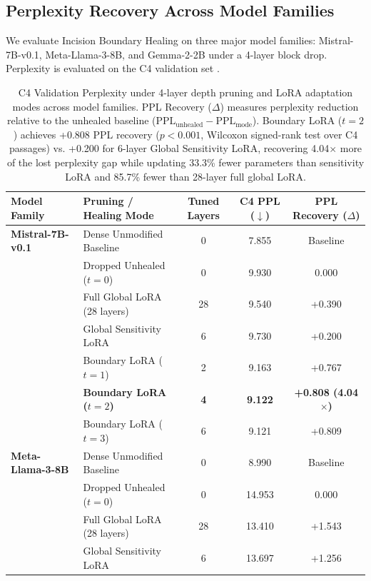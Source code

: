 \documentclass[11pt]{article}
\begin{document}
\subsection{Perplexity Recovery Across Model Families}

We evaluate Incision Boundary Healing on three major model families: Mistral-7B-v0.1, Meta-Llama-3-8B, and Gemma-2-2B under a 4-layer block drop. Perplexity is evaluated on the C4 validation set \citep{raffel2020c4}.

\begin{table}[t!]
\centering
\small
\setlength{\tabcolsep}{8pt}
\caption{C4 Validation Perplexity under 4-layer depth pruning and LoRA adaptation modes across model families. PPL Recovery ($\Delta$) measures perplexity reduction relative to the unhealed baseline ($\text{PPL}_{\text{unhealed}} - \text{PPL}_{\text{mode}}$). Boundary LoRA ($t=2$) achieves +0.808 PPL recovery ($p < 0.001$, Wilcoxon signed-rank test over C4 passages) vs. +0.200 for 6-layer Global Sensitivity LoRA, recovering 4.04$\times$ more of the lost perplexity gap while updating 33.3\% fewer parameters than sensitivity LoRA and 85.7\% fewer than 28-layer full global LoRA.}
\label{tab:ppl_main}
\begin{tabular}{llccc}
\toprule
\textbf{Model Family} & \textbf{Pruning / Healing Mode} & \textbf{Tuned Layers} & \textbf{C4 PPL ($\downarrow$)} & \textbf{PPL Recovery ($\Delta$)} \\
\midrule
\textbf{Mistral-7B-v0.1} & Dense Unmodified Baseline & 0 & 7.855 & Baseline \\
& Dropped Unhealed ($t=0$) & 0 & 9.930 & 0.000 \\
& Full Global LoRA (28 layers) & 28 & 9.540 & +0.390 \\
& Global Sensitivity LoRA & 6 & 9.730 & +0.200 \\
& Boundary LoRA ($t=1$) & 2 & 9.163 & +0.767 \\
& \textbf{Boundary LoRA ($t=2$)} & \textbf{4} & \textbf{9.122} & \textbf{+0.808 (4.04$\times$)} \\
& Boundary LoRA ($t=3$) & 6 & 9.121 & +0.809 \\
\midrule
\textbf{Meta-Llama-3-8B} & Dense Unmodified Baseline & 0 & 8.990 & Baseline \\
& Dropped Unhealed ($t=0$) & 0 & 14.953 & 0.000 \\
& Full Global LoRA (28 layers) & 28 & 13.410 & +1.543 \\
& Global Sensitivity LoRA & 6 & 13.697 & +1.256 \\

\end{tabular}
\end{table}
\end{document}
